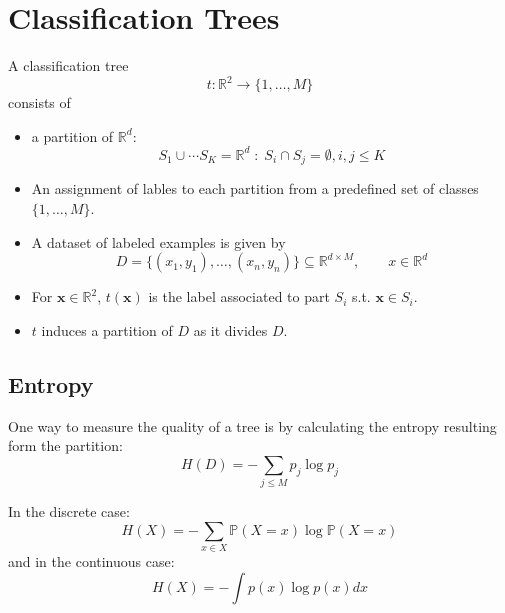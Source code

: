 \section{Classification Trees}
A classification tree
\noindent\begin{equation*}
    t: \mathbb{R}^2 \to \{1,\ldots, M\}
\end{equation*} consists of
\begin{itemize}
    \item a partition of $\mathbb{R}^d$:
          \noindent\begin{equation*}
              S_1\cup \cdots S_K = \mathbb{R}^d \;:\; S_i\cap S_j=\emptyset , i,j\leq K
          \end{equation*}
    \item An assignment of lables to each partition from a predefined set of classes $\{1,\ldots, M\}$.
    \item A dataset of labeled examples is given by
          \noindent\begin{equation*}
              D=\{(x_{1},y_{1}),\ldots,(x_{n},y_{n})\}\subseteq\mathbb{R}^{d\times M},\qquad x\in \mathbb{R}^d
          \end{equation*}
\end{itemize}


\begin{itemize}
    \item For $\mathbf{x}\in\mathbb{R}^2$, $t(\mathbf{x})$ is the label associated to part $S_i$ s.t. $\mathbf{x}\in S_i$.
    \item $t$ induces a partition of $D$ as it divides $D$.
\end{itemize}


\subsection{Entropy}
One way to measure the quality of a tree is by calculating the entropy resulting form the partition:
\noindent\begin{equation*}
    H(D)=-\sum_{j\leq M}p_j\log p_j
\end{equation*}

In the discrete case:
\noindent\begin{equation*}
    H(X)=-\sum_{x\in X}\mathbb{P}(X=x)\log\mathbb{P}(X=x)
\end{equation*}
and in the continuous case:
\noindent\begin{equation*}
    H(X)=-\int p(x)\log p(x) dx
\end{equation*}

